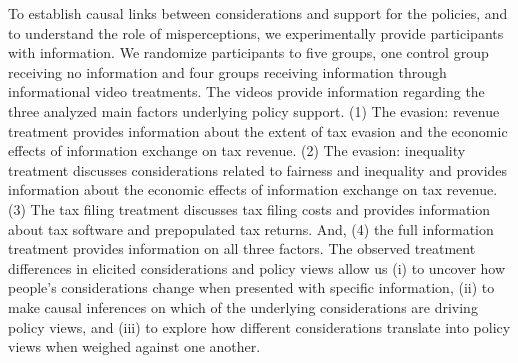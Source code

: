 \documentclass[12pt]{article}
\begin{document}
To establish causal links between considerations and support for the policies, and to understand the role of misperceptions, we experimentally provide participants with information. We randomize participants to five groups, one control group receiving no information and four groups receiving information through informational video treatments. The videos provide information regarding the three analyzed main factors underlying policy support. (1) The evasion: revenue treatment provides information about the extent of tax evasion and the economic effects of information exchange on tax revenue.  (2) The evasion: inequality treatment discusses considerations related to fairness and inequality and provides information about the economic effects of information exchange on tax revenue. (3) The tax filing treatment discusses tax filing costs and provides information about tax software and prepopulated tax returns. And, (4) the full information treatment provides information on all three factors. The observed treatment differences in elicited considerations and policy views allow us (i) to uncover how people's considerations change when presented with specific information, (ii) to make causal inferences on which of the underlying considerations are driving policy views, and (iii) to explore how different considerations translate into policy views when weighed against one another.

\end{document}
